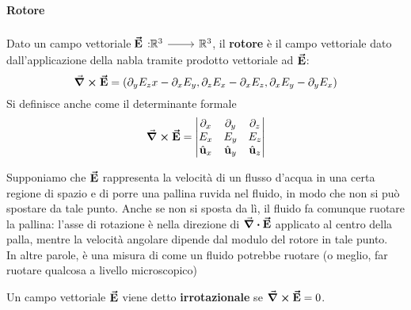\paragraph{Rotore}
\begin{define}[Rotore]
	Dato un campo vettoriale $\funz[\vba{E}]{\realset^3}{\realset^3}$, il \textbf{rotore} è il campo vettoriale dato dall'applicazione della nabla tramite prodotto vettoriale ad $\vb*{\va{E}}$:
	\begin{equation}
		\curl{\vb*{\va{E}}}=(\partial_yE_zx-\partial_xE_y,\partial_zE_x-\partial_xE_z,\partial_xE_y-\partial_yE_x)
	\end{equation}
	Si definisce anche come il determinante formale
	\begin{equation}
		\curl{\vb*{\va{E}}}=\begin{vmatrix}
			\partial_x & \partial_y & \partial_z\\
			E_x & E_y & E_z\\
			\hat{\mathbf{u}}_x & \hat{\mathbf{u}}_y & \hat{\mathbf{u}}_z
		\end{vmatrix}
	\end{equation}
\end{define}
\begin{example}
	Supponiamo che $\vb*{\va{E}}$ rappresenta la velocità di un flusso d'acqua in una certa regione di spazio e di porre una pallina ruvida nel fluido, in modo che non si può spostare da tale punto. Anche se non si sposta da lì, il fluido fa comunque ruotare la pallina: l'asse di rotazione è nella direzione di $\grad \vdot \vba{E}$ applicato al centro della palla, mentre la velocità angolare dipende dal modulo del rotore in tale punto.\\
	In altre parole, è una misura di come un fluido potrebbe ruotare (o meglio, far ruotare qualcosa a livello microscopico)
\end{example}
\begin{define}
	Un campo vettoriale $\vb*{\va{E}}$ viene detto \textbf{irrotazionale} se $\curl{\vb*{\va{E}}}=0$.
\end{define}

